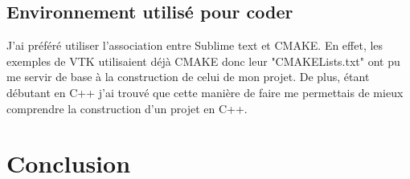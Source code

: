 \documentclass[a4paper,12pt]{article}
\begin{document}
	 \subsection{Environnement utilisé pour coder}
J'ai préféré utiliser l'association entre Sublime text et CMAKE. En effet, les exemples de VTK utilisaient déjà CMAKE donc leur "CMAKELists.txt" ont pu me servir de base à la construction de celui de mon projet. De plus, étant débutant en C++ j'ai trouvé que cette manière de faire me permettais de mieux comprendre la construction d'un projet en C++.

\newpage
\section{Conclusion}
	
		
\end{document}
